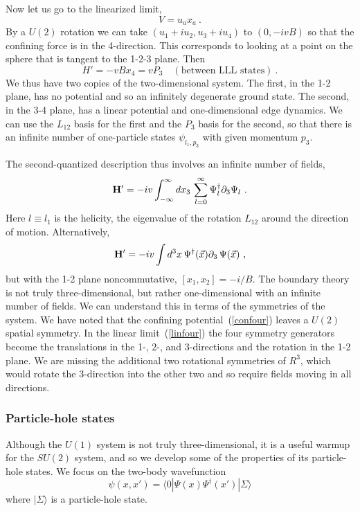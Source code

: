 \documentclass[a4paper,12pt]{article}
\newcommand{\R}{R}
\begin{document}
Now let us go to the linearized limit,
\begin{equation}
V = u_a x_a\ .
\label{linfour}
\end{equation}
By a $U(2)$ rotation we can take $(u_1 + i u_2,u_3 + i u_4)$ to
$(0, -i v B)$ so that the confining force is in the 4-direction.  This
corresponds to looking at a point on the sphere that is tangent to the
1-2-3 plane.  Then 
\begin{equation}
H' = -v B x_4 = v P_3\quad (\mbox{between LLL states})\ .
\end{equation}
We thus have two copies of the two-dimensional system. 
The first, in the 1-2 plane, has no potential and so an
infinitely degenerate ground state.  The second, in the 3-4 plane, has a
linear potential and one-dimensional edge dynamics.  We can use the
$L_{12}$ basis for the first and the
$P_3$ basis for the second, so that there is an infinite number of
one-particle states $\psi_{l_1,p_3}$ with given momentum $p_3$.

The second-quantized description thus involves an infinite number of
fields,
\begin{equation}
{\bf H}'
= -iv \int_{-\infty}^\infty dx_3\, \sum_{l=0}^\infty \Psi_l^\dagger
\partial_3
\Psi_l\ .
\end{equation}
Here $l \equiv l_1$ is the helicity, the eigenvalue of the
rotation $L_{12}$ around the direction of motion.
Alternatively,
\begin{equation}
{\bf H}' = - i v \int  d^3x\, \Psi^\dagger(\vec x)  \partial_3 \,
\Psi(\vec x)\ ,
\end{equation}
but with the 1-2 plane noncommutative, $[x_1,x_2] = -i/B$.
The boundary theory is not truly three-dimensional, but rather
one-dimensional with an infinite number of fields.  We can understand this
in terms of the symmetries of the system.  We have noted that the
confining potential~(\ref{confour}) leaves a $U(2)$ spatial symmetry.  In
the linear limit~(\ref{linfour}) the four symmetry generators become the
translations in the 1-, 2-, and 3-directions and the rotation in the 1-2
plane.  We are missing the additional two rotational symmetries of
$\R^3$, which would rotate the 3-direction into the other two and so require
fields moving in all directions.


\subsubsection{Particle-hole states}

Although the $U(1)$ system is not truly three-dimensional, it is a useful
warmup for the $SU(2)$ system, and so we develop some of the properties of
its particle-hole states.  We focus on the two-body wavefunction
\begin{equation}
\psi(x,x') = \langle 0|  \Psi (x)  \Psi^\dagger(x') | \Sigma\rangle
\end{equation}
where $| \Sigma\rangle$ is a particle-hole state.
\end{document}

